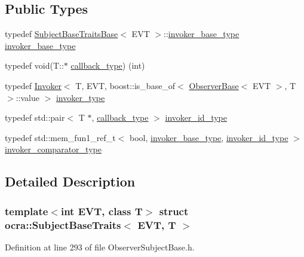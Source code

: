 \subsection*{Public Types}
\begin{DoxyCompactItemize}
\item 
typedef \hyperlink{structocra_1_1SubjectBaseTraitsBase}{Subject\+Base\+Traits\+Base}$<$ E\+VT $>$\+::\hyperlink{structocra_1_1SubjectBaseTraitsBase_a439671662c8f8f3e80e6675f008dec3f}{invoker\+\_\+base\+\_\+type} \hyperlink{structocra_1_1SubjectBaseTraits_a067ad14df588b765cd8941e21348c954}{invoker\+\_\+base\+\_\+type}
\item 
typedef void(T\+::$\ast$ \hyperlink{structocra_1_1SubjectBaseTraits_ab8c572ba6805d72ddf4137da6e2f4480}{callback\+\_\+type}) (int)
\item 
typedef \hyperlink{classocra_1_1Invoker}{Invoker}$<$ T, E\+VT, boost\+::is\+\_\+base\+\_\+of$<$ \hyperlink{classocra_1_1ObserverBase}{Observer\+Base}$<$ E\+VT $>$, T $>$\+::value $>$ \hyperlink{structocra_1_1SubjectBaseTraits_a7d6f024ca6d59f607025916cbb7a3423}{invoker\+\_\+type}
\item 
typedef std\+::pair$<$ T $\ast$, \hyperlink{structocra_1_1SubjectBaseTraits_ab8c572ba6805d72ddf4137da6e2f4480}{callback\+\_\+type} $>$ \hyperlink{structocra_1_1SubjectBaseTraits_a2c4f3af9b3e93bf96232c36df6f43986}{invoker\+\_\+id\+\_\+type}
\item 
typedef std\+::mem\+\_\+fun1\+\_\+ref\+\_\+t$<$ bool, \hyperlink{structocra_1_1SubjectBaseTraitsBase_a439671662c8f8f3e80e6675f008dec3f}{invoker\+\_\+base\+\_\+type}, \hyperlink{structocra_1_1SubjectBaseTraits_a2c4f3af9b3e93bf96232c36df6f43986}{invoker\+\_\+id\+\_\+type} $>$ \hyperlink{structocra_1_1SubjectBaseTraits_a791cf85201dfcbdc6213946c36d698ca}{invoker\+\_\+comparator\+\_\+type}
\end{DoxyCompactItemize}


\subsection{Detailed Description}
\subsubsection*{template$<$int E\+VT, class T$>$\newline
struct ocra\+::\+Subject\+Base\+Traits$<$ E\+V\+T, T $>$}



Definition at line 293 of file Observer\+Subject\+Base.\+h.



